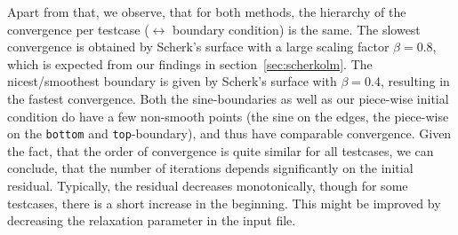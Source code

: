 \documentclass[11pt]{scrartcl}
\begin{document}
Apart from that, we observe, that for both methods, the hierarchy of the convergence per testcase ($\leftrightarrow$ boundary condition) is the same. The slowest convergence is obtained by Scherk's surface with a large scaling factor $\beta=0.8$, which is expected from our findings in section~\ref{sec:scherkolm}. The nicest/smoothest boundary is given by Scherk's surface with $\beta=0.4$, resulting in the fastest convergence. Both the sine-boundaries as well as our piece-wise initial condition do have a few non-smooth points (the sine on the edges, the piece-wise on the \texttt{bottom} and \texttt{top}-boundary), and thus have comparable convergence. 
Given the fact, that the order of convergence is quite similar for all testcases, we can conclude, that the number of iterations depends significantly on the initial residual. Typically, the residual decreases monotonically, though for some testcases, there is a short increase in the beginning. This might be improved by decreasing the relaxation parameter in the input file.
\end{document}
